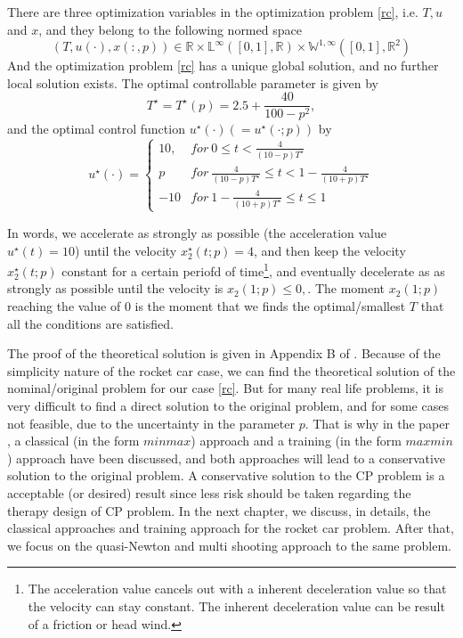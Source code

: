 There are three optimization variables in the optimization problem \ref{rc}, i.e. $T, u$ and $x$, and they belong to the following normed space
\begin{equation}
	(T, u(\cdot), x(:,p)) \in \mathbb{R} \times \mathbb{L}^\infty([0,1], \mathbb{R}) \times  \mathbb{W}^{1,\infty}([0,1], \mathbb{R}^2)
\end{equation}
And the optimization problem \ref{rc} has a unique global solution, and no further local solution exists. The optimal controllable parameter is given by 
\begin{equation}
	T^\star = T^\star(p) = 2.5 + \frac{40}{100-p^2},
\end{equation}
and the optimal control function $u^\star(\cdot) (= u^\star(\cdot; p))$ by 
\begin{equation}
	u^\star(\cdot) =     \left\{
	\begin{array}{ll}
		10, & for \  0 \leq t <  \frac{4}{(10-p)T^\star}\\
		p  &  for \ \frac{4}{(10-p)T^\star} \leq t < 1- \frac{4}{(10+p)T^\star} \\
		-10  & for \  1- \frac{4}{(10+p)T^\star} \leq t \leq 1 
	\end{array}
	\right.
\end{equation}

In words, we accelerate as strongly as possible (the acceleration value $u^\star(t)=10$) until the velocity $x^\star_2(t;p)=4$, and then keep the velocity $x^\star_2(t;p)$ constant for a certain periofd of time\footnote{The acceleration value cancels out with a inherent deceleration value so that the velocity can stay constant. The inherent deceleration value can be result of a friction or head wind.}, and eventually decelerate as as strongly as possible until the velocity is $x_2(1;p) \leq 0, \label{rc_x2_t1}$. The moment $x_2(1;p)$ reaching the value of $0$ is the moment that we finds the optimal/smallest $T$ that all the conditions are satisfied. 

The proof of the theoretical solution is given in Appendix B of \cite{MatSch22}. Because of the simplicity nature of the rocket car case, we can find the theoretical solution of the nominal/original problem for our case \ref{rc}. But for many real life problems, it is very difficult to find a direct solution to the original problem, and for some cases not feasible, due to the uncertainty in the parameter $p$. That is why in the paper \cite{MatSch22}, a classical (in the form $minmax$) approach and a training (in the form $maxmin$) approach have been discussed, and both approaches will lead to a conservative solution to the original problem. A conservative solution to the CP problem is a acceptable (or desired) result since less risk should be taken regarding the therapy design of CP problem. In the next chapter, we discuss, in details, the classical approaches and training approach for the rocket car problem. After that, we focus on the quasi-Newton and multi shooting approach to the same problem.  






